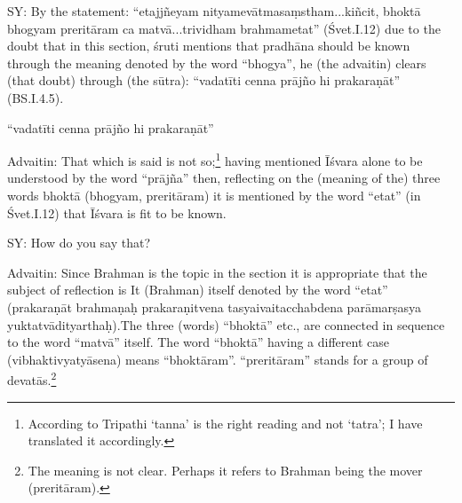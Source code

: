 SY: By the statement: “etajjñeyam  nityamevātmasaṃstham...kiñcit, bhoktā bhogyam preritāram ca matvā...trividham brahmametat” (Śvet.I.12)  due to the doubt that in this section, śruti mentions that pradhāna should be known through the meaning denoted by the word  “bhogya”, he (the advaitin) clears (that doubt) through (the sūtra): “vadatīti cenna prājño hi prakaraṇāt” (BS.I.4.5).

\vskip 4pt

\textbf{}


\vskip 2pt

“vadatīti cenna prājño hi prakaraṇāt”

\vskip 2pt

Advaitin: That which is said is not so;\footnote{According to Tripathi ‘tanna’ is the right reading and not ‘tatra’; I have translated it accordingly.} having mentioned Īśvara alone to be understood by the word “prājña” then, reflecting on the (meaning of the) three words bhoktā (bhogyam, preritāram) it is mentioned by the word “etat” (in Śvet.I.12) that Īśvara is fit to be known. 

\vskip 2pt

SY: How do you say that? 
 
\vskip 2pt

Advaitin: Since Brahman is the topic in the section it is appropriate that the subject of reflection is It (Brahman) itself  denoted by the word “etat” (prakaraṇāt brahmaṇaḥ prakaraṇitvena tasyaivaitacchabdena parāmarṣasya yuktatvādityarthaḥ).The three (words)  “bhoktā” etc., are connected in sequence to  the word “matvā” itself. The word “bhoktā” having a different case (vibhaktivyatyāsena) means “bhoktāram”. “preritāram” stands for a group of devatās.\footnote{The meaning is not clear. Perhaps it refers to Brahman being the mover (preritāram).}

\vskip 2pt

\textbf{}


